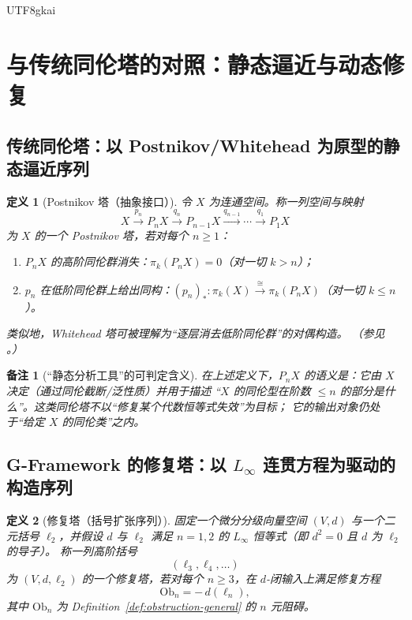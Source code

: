 \documentclass[12pt]{article}
\newtheorem{definition}{定义}[section]
\newtheorem{remark}{备注}[section]
\newcommand{\Layer}{\ensuremath{\ell}}
\newcommand{\Ob}{\mathrm{Ob}}
\begin{document}
\begin{CJK*}{UTF8}{gkai}
\section{与传统同伦塔的对照：静态逼近与动态修复}
\label{sec:homotopy-tower-vs-repair}

\subsection{传统同伦塔：以 Postnikov/Whitehead 为原型的静态逼近序列}

\begin{definition}[Postnikov 塔（抽象接口）]\label{def:postnikov-tower}
令 $X$ 为连通空间。称一列空间与映射
\[
  X \xrightarrow{p_n} P_n X \xrightarrow{q_n} P_{n-1}X \xrightarrow{q_{n-1}} \cdots \xrightarrow{q_1} P_1X
\]
为 $X$ 的一个 \emph{Postnikov 塔}，若对每个 $n\ge 1$：
\begin{enumerate}
  \item $P_nX$ 的高阶同伦群消失：$\pi_k(P_nX)=0$（对一切 $k>n$）；
  \item $p_n$ 在低阶同伦群上给出同构：$(p_n)_*:\pi_k(X)\xrightarrow{\ \cong\ }\pi_k(P_nX)$（对一切 $k\le n$）。
\end{enumerate}
类似地，Whitehead 塔可被理解为“逐层消去低阶同伦群”的对偶构造。
（参见 \cite{HatcherAT}。）
\end{definition}

\begin{remark}[“静态分析工具”的可判定含义]
在上述定义下，$P_nX$ 的语义是：它由 $X$ \emph{决定}（通过同伦截断/泛性质）并用于\emph{描述}
“$X$ 的同伦型在阶数 $\le n$ 的部分是什么”。这类同伦塔不以“修复某个代数恒等式失效”为目标；
它的输出对象仍处于“给定 $X$ 的同伦类”之内。
\end{remark}

\subsection{G-Framework 的修复塔：以 $L_\infty$ 连贯方程为驱动的构造序列}

\begin{definition}[修复塔（括号扩张序列）]
固定一个微分分级向量空间 $(V,d)$ 与一个二元括号 $\Layer_2$，并假设 $d$ 与 $\Layer_2$ 满足
$n=1,2$ 的 $L_\infty$ 恒等式（即 $d^2=0$ 且 $d$ 为 $\Layer_2$ 的导子）。
称一列高阶括号
\[
  (\Layer_3,\Layer_4,\dots)
\]
为 $(V,d,\Layer_2)$ 的一个\emph{修复塔}，若对每个 $n\ge 3$，在 $d$-闭输入上满足修复方程
\[
  \Ob_n = -\,d(\Layer_n),
\]
其中 $\Ob_n$ 为 Definition~\ref{def:obstruction-general} 的 $n$ 元阻碍。
\end{definition}


\end{CJK*}
\end{document}
